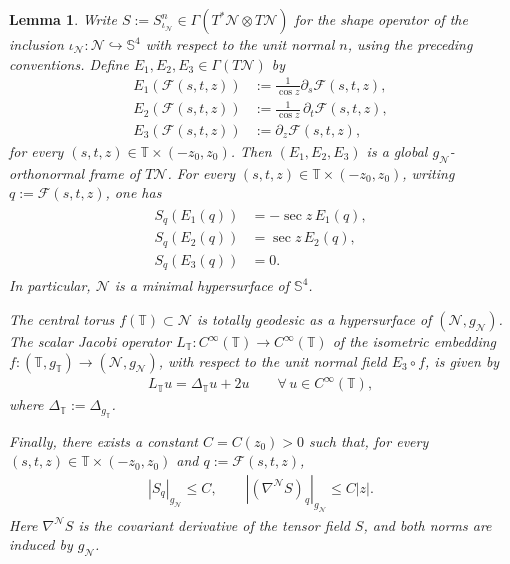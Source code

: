 \documentclass[a4paper,11pt,oneside,reqno]{amsart}
\numberwithin{equation}{section}
\newtheorem{lemma}[theorem]{Lemma}
\theoremstyle{definition}
\begin{document}
\begin{lemma}
    \label{lem:s4-suspension-geometry}
    Write $S:=S_{\iota_{\mathcal{N}}}^n\in\Gamma(T^*\mathcal{N}\otimes T\mathcal{N})$ for the shape
    operator of the inclusion $\iota_{\mathcal{N}}:\mathcal{N}\hookrightarrow\mathbb{S}^4$ with respect to the unit normal $n$, using the preceding conventions.
    Define $E_1,E_2,E_3\in\Gamma(T\mathcal{N})$ by
    \begin{align*}
        E_1(\mathcal{F}(s,t,z))&:=\frac{1}{\cos z}\partial_s\mathcal F(s,t,z),\\
        E_2(\mathcal{F}(s,t,z))&:=\frac{1}{\cos z}\,
        \partial_t\mathcal F(s,t,z),\\
        E_3(\mathcal{F}(s,t,z))&:=\partial_z\mathcal F(s,t,z),
    \end{align*}
    for every $(s,t,z)\in\mathbb{T}\times(-z_0,z_0)$.
    Then $(E_1,E_2,E_3)$ is a global
    $g_{\mathcal{N}}$-orthonormal frame of $T\mathcal{N}$. For every $(s,t,z)\in\mathbb{T}\times(-z_0,z_0)$, writing $q:=\mathcal{F}(s,t,z)$, one has
    \begin{align}
        \label{eq:s4-S}
        \begin{split}
            S_q(E_1(q))&=-\sec z\,E_1(q),\\
            S_q(E_2(q))&=\sec z\,E_2(q),\\
            S_q(E_3(q))&=0.
        \end{split}
    \end{align}
    In particular, $\mathcal{N}$ is a minimal hypersurface of $\mathbb{S}^4$.

    The central torus $f(\mathbb{T})\subset\mathcal N$ is totally geodesic as a hypersurface of $(\mathcal{N},g_{\mathcal{N}})$. The scalar Jacobi operator
    $L_{\mathbb{T}}:C^\infty(\mathbb{T})\to C^\infty(\mathbb{T})$
    of the isometric embedding
    $f:(\mathbb{T},g_{\mathbb{T}})\to(\mathcal{N},g_{\mathcal{N}})$,
    with respect to the unit normal field $E_3\circ f$,
    is given by
    \begin{align}
        \label{eq:s4-base-Jacobi}
        L_{\mathbb{T}}u=\Delta_{\mathbb{T}}u+2u
        \qquad\forall\,u\in C^\infty(\mathbb{T}),
    \end{align}
    where $\Delta_{\mathbb{T}}:=\Delta_{g_{\mathbb{T}}}$.

    Finally, there exists a constant $C=C(z_0)>0$ such that, for every $(s,t,z)\in\mathbb{T}\times(-z_0,z_0)$ and $q:=\mathcal{F}(s,t,z)$,
    \begin{align}
        \label{eq:s4-S-derivative}
        |S_q|_{g_{\mathcal{N}}}\leq C, 
        \qquad
        |(\nabla^{\mathcal{N}}S)_q|_{g_{\mathcal{N}}}
        \leq C|z|.
    \end{align}
    Here $\nabla^{\mathcal{N}}S$ is the covariant derivative of
    the tensor field $S$, and both norms are induced by
    $g_{\mathcal{N}}$.
\end{lemma}
\end{document}

